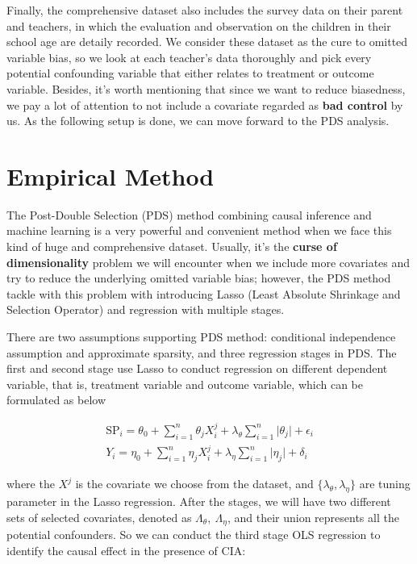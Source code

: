 \documentclass[]{AEA}
\begin{document}
    Finally, the comprehensive dataset also includes the survey data on their parent and teachers, in which the evaluation and observation on the children in their school age are detaily recorded.  We consider these dataset as the cure to omitted variable bias, so we look at each teacher's data thoroughly and pick every potential confounding variable that either relates to treatment or outcome variable.  Besides, it's worth mentioning that since we want to reduce biasedness, we pay a lot of attention to not include a covariate regarded as \textbf{bad control} by us.  As the following setup is done, we can move forward to the PDS analysis.


\section{Empirical Method} %

    The Post-Double Selection (PDS) method combining causal inference and machine learning is a very powerful and convenient method when we face this kind of huge and comprehensive dataset.  Usually, it's the \textbf{curse of dimensionality} problem we will encounter when we include more covariates and try to reduce the underlying omitted variable bias; however, the PDS method tackle with this problem with introducing Lasso (Least Absolute Shrinkage and Selection Operator) and regression with multiple stages.

    There are two assumptions supporting PDS method: conditional independence assumption and approximate sparsity, and three regression stages in PDS.  The first and second stage use Lasso to conduct regression on different dependent variable, that is, treatment variable and outcome variable, which can be formulated as below

    \begin{align}
    \text{SP}_i = \theta_0 + \sum_{i=1}^n \theta_j X_i^j + \lambda_\theta\sum_{i=1}^n \lvert \theta_j \rvert + \epsilon_i \\
    Y_i         = \eta_0   + \sum_{i=1}^n \eta_j X_i^j   + \lambda_\eta\sum_{i=1}^n \lvert \eta_j   \rvert + \delta_i
    \end{align}

    where the $X^j$ is the covariate we choose from the dataset, and $\{\lambda_\theta,\lambda_\eta\}$ are tuning parameter in the Lasso regression.  After the stages, we will have two different sets of selected covariates, denoted as $\Lambda_\theta,\ \Lambda_\eta$, and their union represents all the potential confounders.  So we can conduct the third stage OLS regression to identify the causal effect in the presence of CIA:
\end{document}
